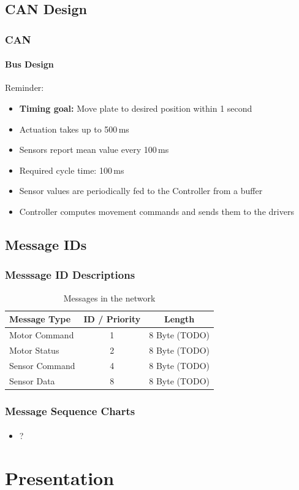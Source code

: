 \documentclass{beamer}
\begin{document}
\subsection{CAN Design}
\begin{frame}
  \frametitle{CAN}
  \framesubtitle{Bus Design}
	Reminder:
	\begin{itemize}
		\item \textbf{Timing goal:} Move plate to desired position within 1 second
		\item Actuation takes up to 500\,ms
		\item Sensors report mean value every 100\,ms
	\end{itemize}
	\vfill
  \begin{itemize}
    \item Required cycle time: 100\,ms
    \item Sensor values are periodically fed to the Controller from a buffer
    \item Controller computes movement commands and sends them to the drivers
  \end{itemize}
\end{frame}

\subsection{Message IDs}
\begin{frame}
  \frametitle{Messsage ID Descriptions}
  \begin{table}
\begin{tabular}{l | c | c }
Message Type & ID / Priority & Length \\
\hline \hline
Motor Command & 1 & 8 Byte (TODO)\\
Motor Status & 2 & 8 Byte (TODO) \\
Sensor Command & 4 & 8 Byte (TODO) \\
Sensor Data & 8 & 8 Byte (TODO)
\end{tabular}
\caption{Messages in the network}
\end{table}
\end{frame}

\begin{frame}
  \frametitle{Message Sequence Charts}
  \framesubtitle{}
  \begin{itemize}
    \item ?
  \end{itemize}
\end{frame}

\section{Presentation}
\end{document}
